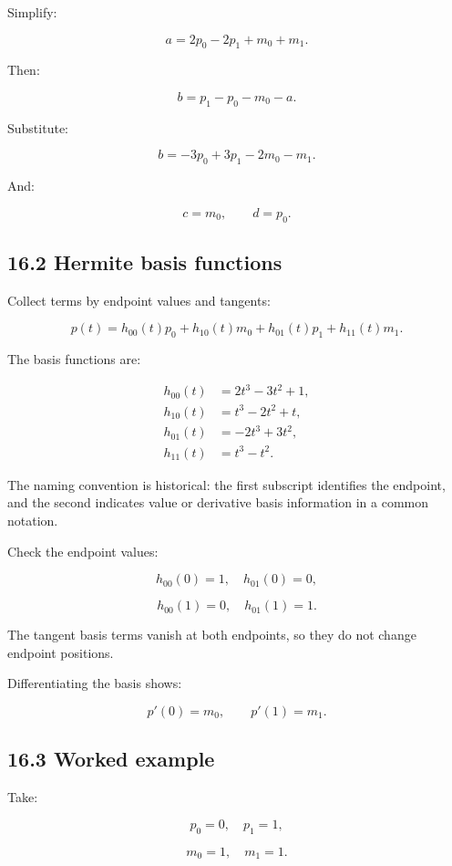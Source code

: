 Simplify:

\[ \boxed{ a=2p_0-2p_1+m_0+m_1 }. \]

Then:

\[ b=p_1-p_0-m_0-a. \]

Substitute:

\[ \boxed{ b=-3p_0+3p_1-2m_0-m_1 }. \]

And:

\[ c=m_0,\qquad d=p_0. \]

\subsection{16.2 Hermite basis functions}\label{02-foundations-ii-ch028-hermite-basis-functions}

Collect terms by endpoint values and tangents:

\[ \boxed{ p(t)= h_{00}(t)p_0+ h_{10}(t)m_0+ h_{01}(t)p_1+ h_{11}(t)m_1 }. \]

The basis functions are:

\[ \boxed{ \begin{aligned} h_{00}(t)&=2t^3-3t^2+1,\\ h_{10}(t)&=t^3-2t^2+t,\\ h_{01}(t)&=-2t^3+3t^2,\\ h_{11}(t)&=t^3-t^2. \end{aligned} } \]

The naming convention is historical: the first subscript identifies the endpoint, and the second indicates value or derivative basis information in a common notation.

Check the endpoint values:

\[ h_{00}(0)=1,\quad h_{01}(0)=0, \]

\[ h_{00}(1)=0,\quad h_{01}(1)=1. \]

The tangent basis terms vanish at both endpoints, so they do not change endpoint positions.

Differentiating the basis shows:

\[ p'(0)=m_0,\qquad p'(1)=m_1. \]

\subsection{16.3 Worked example}\label{02-foundations-ii-ch028-worked-example-3}

Take:

\[ p_0=0,\quad p_1=1, \]

\[ m_0=1,\quad m_1=1. \]


